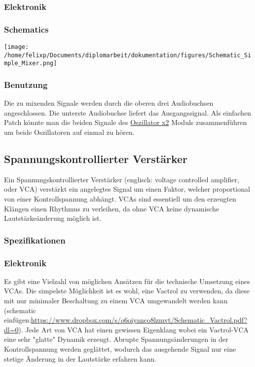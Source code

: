\subsubsection{Elektronik}
\label{sec:orgf1b66a3}
\subsubsection{Schematics}
\label{sec:orgf60369e}
\begin{center}
\texttt{[image: /home/felixp/Documents/diplomarbeit/dokumentation/figures/Schematic\_Simple\_Mixer.png]}
\end{center}
\subsubsection{Benutzung}
\label{sec:org9e04fcf}
Die zu mixenden Signale werden durch die oberen drei Audiobuchsen angeschlossen. Die unterste Audiobuchse liefert das Ausgangssignal. Als einfachen Patch könnte man die beiden Signale des \href{modules/oscillator.org}{Oszillator x2} Moduls zusammenführen um beide Oszillatoren auf einmal zu hören.

\subsection{Spannungskontrollierter Verstärker}
\label{sec:org59b8bbb}
Ein Spannungskontrollierter Verstärker (englisch: voltage controlled amplifier, oder VCA) verstärkt ein angelegtes Signal um einen Faktor, welcher proportional von einer Kontrollspannung abhängt. VCAs sind essentiell um den erzeugten Klängen einen Rhythmus zu verleihen, da ohne VCA keine dynamische Lautstärkeänderung möglich ist. 
\subsubsection{Spezifikationen}
\label{sec:org9ce78ee}
\subsubsection{Elektronik}
\label{sec:orgfb1c236}
Es gibt eine Vielzahl von möglichen Ansätzen für die technische Umsetzung eines VCAs. Die simpelste Möglichkeit ist es wohl, eine Vactrol zu verwenden, da diese mit nur minimaler Beschaltung zu einem VCA umgewandelt werden kann (schematic einfügen:\url{https://www.dropbox.com/s/o6oiyanco8lzmvt/Schematic\_Vactrol.pdf?dl=0}). Jede Art von VCA hat einen gewissen Eigenklang wobei ein Vactrol-VCA eine sehr "glatte" Dynamik erzeugt. Abrupte Spannungsänderungen in der Kontrollspannung werden geglättet, wodurch das ausgehende Signal nur eine stetige Änderung in der Lautstärke erfahren kann.

